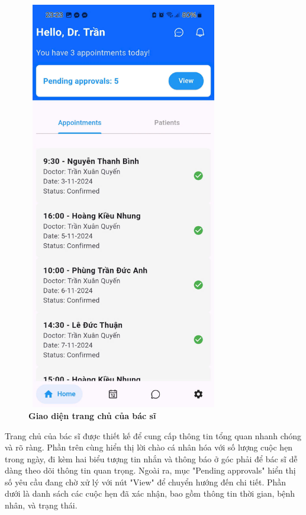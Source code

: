 \begin{figure}[H]
	\centering
	\includegraphics[width=8.5cm,height=18cm]{Images/AppUI/homePage1Doctor.jpg}
	\caption[Giao diện trang chủ của bác sĩ]{\bfseries \fontsize{12pt}{0pt}\selectfont Giao diện trang chủ của bác sĩ}
	\label{homeDoctor}
\end{figure}
Trang chủ của bác sĩ được thiết kế để cung cấp thông tin tổng quan nhanh chóng và rõ ràng. Phần trên cùng hiển thị lời chào cá nhân hóa với số lượng cuộc hẹn trong ngày, đi kèm hai biểu tượng tin nhắn và thông báo ở góc phải để bác sĩ dễ dàng theo dõi thông tin quan trọng. Ngoài ra, mục "Pending approvals" hiển thị số yêu cầu đang chờ xử lý với nút "View" để chuyển hướng đến chi tiết. Phần dưới là danh sách các cuộc hẹn đã xác nhận, bao gồm thông tin thời gian, bệnh nhân, và trạng thái.

